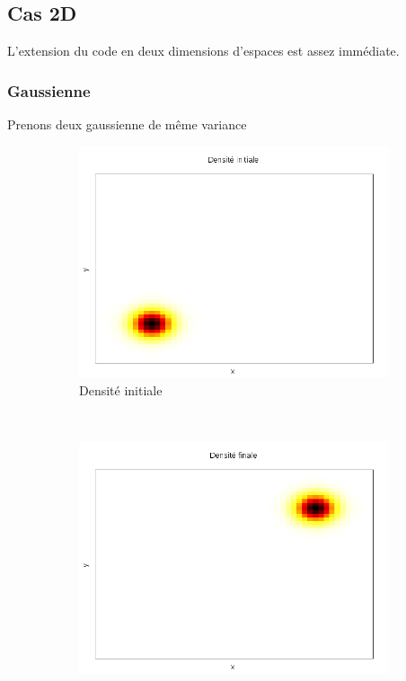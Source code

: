 \documentclass[a4paper,12pt]{article}
\begin{document}
\subsection{Cas 2D}
L'extension du code en deux dimensions d'espaces est assez immédiate. 
\subsubsection{Gaussienne}
Prenons deux gaussienne de même variance 
\begin{figure}[!h]
\centering 
\hspace{-0.5cm}
	\begin{subfigure}[b]{0.3\linewidth}
	\includegraphics[width=\textwidth]{img/2DGaussian/f0.png}
	\caption{Densité initiale}
	\end{subfigure}
	~
	\begin{subfigure}[b]{0.3\linewidth}
	\includegraphics[width=\textwidth]{img/2DGaussian/f1.png}

\end{subfigure}
\end{figure}
\end{document}
